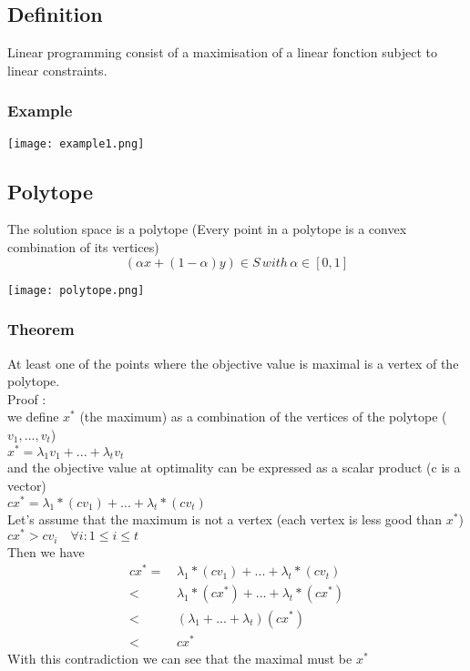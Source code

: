 \subsection{Definition}

Linear programming consist of a maximisation of a linear fonction subject to linear constraints.

\subsubsection{Example}

\centerline{\texttt{[image: example1.png]}}

\subsection{Polytope}
The solution space is a polytope (Every point in a polytope is a convex combination of its vertices) \\
\begin{equation*}
(\alpha x + (1 - \alpha)y) \in S \,  with \, \alpha \in [0,1]
\end{equation*}
\centerline{\texttt{[image: polytope.png]}}

\subsubsection{Theorem}
At least one of the points where the objective value is maximal is a vertex of the polytope. \\
Proof : \\
we define $x^{*}$ (the maximum) as a combination of the vertices of the polytope ($v_{1},...,v_{t}$)\\
$x^{*} = \lambda_{1} v_{1} + ... + \lambda_{t} v_{t}$ \\
and the objective value at optimality can be expressed as a scalar product (c is a vector)\\
$c x^{*} = \lambda_{1} * (cv_{1}) + ... + \lambda_{t} * (cv_{t})$ \\
Let's assume that the maximum is not a vertex (each vertex is less good than $x^{*}$) \\
$cx^{*} > cv_{i} \quad \forall i : 1 \leq i \leq t$ \\
Then we have \\
\begin{align*}
cx^{*} =& \, \lambda_{1} * (cv_{1}) + ... + \lambda_{t} * (cv_{t}) \\
<& \, \lambda_{1} * (cx^{*}) + ... + \lambda_{t} * (cx^{*}) \\
<& \, (\lambda_{1} + ... + \lambda_{t}) (cx^{*}) \\
<& \, cx^{*}
\end{align*}
With this contradiction we can see that the maximal must be $x^{*}$

